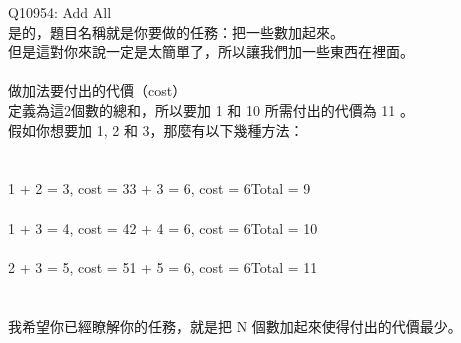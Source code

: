 Q10954: Add All\\
是的，題目名稱就是你要做的任務：把一些數加起來。\\
但是這對你來說一定是太簡單了，所以讓我們加一些東西在裡面。\\
\\
做加法要付出的代價（cost）\\
定義為這2個數的總和，所以要加 1 和 10 所需付出的代價為 11 。\\
假如你想要加 1, 2 和 3，那麼有以下幾種方法：\\
\\
\\
1 + 2 = 3, cost = 33 + 3 = 6, cost = 6Total = 9\\
\\
1 + 3 = 4, cost = 42 + 4 = 6, cost = 6Total = 10\\
\\
2 + 3 = 5, cost = 51 + 5 = 6, cost = 6Total = 11\\
\\
\\
我希望你已經瞭解你的任務，就是把 N 個數加起來使得付出的代價最少。\\
